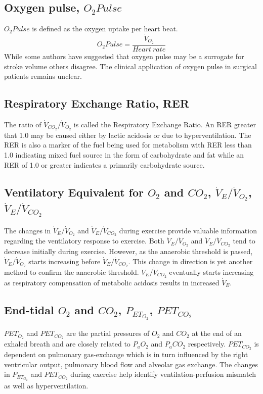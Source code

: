 \subsection[Oxygen pulse]{Oxygen pulse, $O_2Pulse$}
$O_2Pulse$ is defined as the oxygen uptake per heart beat.
\begin{equation} \label{eq:oxygen_pulse}
	O_2Pulse = \frac{\dot{V}_{O_2}}{Heart\ rate}
\end{equation}
While some authors have suggested that oxygen pulse may be a surrogate for stroke volume others disagree. 
The clinical application of oxygen pulse in surgical patients remains unclear.

\subsection[Respiratory Exchange Ratio]{Respiratory Exchange Ratio, RER}
The ratio of $\dot{V}_{CO_2}/\dot{V}_{O_2}$ is called the Respiratory Exchange Ratio. 
An RER greater that 1.0 may be caused either by lactic acidosis or due to hyperventilation. 
The RER is also a marker of the fuel being used for metabolism with RER less than 1.0 indicating mixed fuel source in the form of carbohydrate and fat while an RER of 1.0 or greater indicates a primarily carbohydrate source.

\subsection[Ventilatory Equivalent for O2 and CO2]{Ventilatory Equivalent for $O_2$ and $CO_2$, $\dot{V}_E/\dot{V}_{O_2}$, $\dot{V}_E/\dot{V}_{CO_2}$}
The changes in $\dot{V}_E/\dot{V}_{O_2}$ and $\dot{V}_E/\dot{V}_{CO_2}$ during exercise provide valuable information regarding the ventilatory response to exercise. 
Both $\dot{V}_E/\dot{V}_{O_2}$ and $\dot{V}_E/\dot{V}_{CO_2}$ tend to decrease initially during exercise. 
However, as the anaerobic threshold is passed, $\dot{V}_E/\dot{V}_{O_2}$ starts increasing before $\dot{V}_E/\dot{V}_{CO_2}$. 
This change in direction is yet another method to confirm the anaerobic threshold. $\dot{V}_E/\dot{V}_{CO_2}$ eventually starts increasing as respiratory compensation of metabolic acidosis results in increased $\dot{V}_E$.

\subsection[End-tidal O2, CO2]{End-tidal $O_2$ and $CO_2$, $P_{ET_{O_2}}$, $P{ET_{CO_2}}$}
$PET_{O_2}$ and $PET_{CO_2}$ are the partial pressures of $O_2$ and $CO_2$ at the end of an exhaled breath and are closely related to $P_aO_2$ and $P_aCO_2$ respectively. $P{ET_{CO_2}}$ is dependent on pulmonary gas-exchange which is in turn influenced by the right ventricular output, pulmonary blood flow and alveolar gas exchange. 
The changes in $P_{ET_{O_2}}$ and $P{ET_{CO_2}}$ during exercise help identify ventilation-perfusion mismatch as well as hyperventilation.

